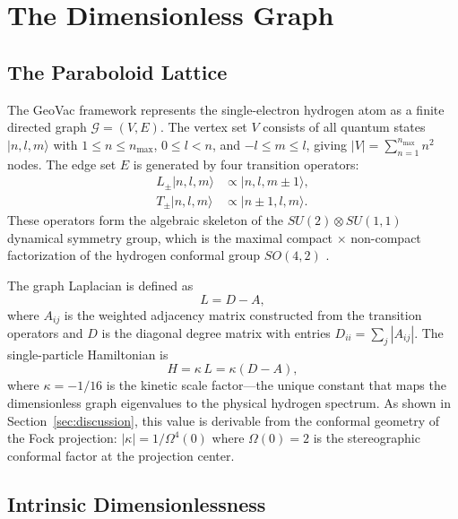 \documentclass[aps,pra,twocolumn,superscriptaddress,longbibliography]{revtex4-2}
\begin{document}
\section{The Dimensionless Graph}
\label{sec:graph}

\subsection{The Paraboloid Lattice}

The GeoVac framework represents the single-electron hydrogen atom as a finite directed graph $\mathcal{G} = (V, E)$. The vertex set $V$ consists of all quantum states $|n, l, m\rangle$ with $1 \leq n \leq n_{\max}$, $0 \leq l < n$, and $-l \leq m \leq l$, giving $|V| = \sum_{n=1}^{n_{\max}} n^2$ nodes. The edge set $E$ is generated by four transition operators:
\begin{align}
L_\pm |n, l, m\rangle &\propto |n, l, m \pm 1\rangle, \label{eq:angular}\\
T_\pm |n, l, m\rangle &\propto |n \pm 1, l, m\rangle. \label{eq:radial}
\end{align}
These operators form the algebraic skeleton of the $SU(2) \otimes SU(1,1)$ dynamical symmetry group, which is the maximal compact$\,\times\,$non-compact factorization of the hydrogen conformal group $SO(4,2)$ \cite{barut1967}.

The graph Laplacian is defined as
\begin{equation}
L = D - A,
\label{eq:laplacian}
\end{equation}
where $A_{ij}$ is the weighted adjacency matrix constructed from the transition operators and $D$ is the diagonal degree matrix with entries $D_{ii} = \sum_j |A_{ij}|$. The single-particle Hamiltonian is
\begin{equation}
H = \kappa\, L = \kappa(D - A),
\label{eq:hamiltonian}
\end{equation}
where $\kappa = -1/16$ is the kinetic scale factor---the unique constant that maps the dimensionless graph eigenvalues to the physical hydrogen spectrum.  As shown in Section~\ref{sec:discussion}, this value is derivable from the conformal geometry of the Fock projection: $|\kappa| = 1/\Omega^4(0)$ where $\Omega(0) = 2$ is the stereographic conformal factor at the projection center.

\subsection{Intrinsic Dimensionlessness}
\end{document}
